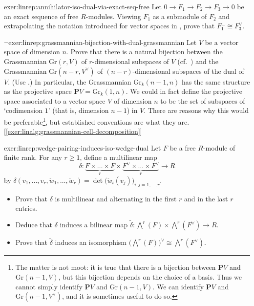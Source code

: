 \begin{exer}{}{exer:linrep:annihilator-iso-dual-via-exact-seq-free}
  Let $0 \to F_1 \to F_2 \to F_3 \to 0$ be an exact sequence of free
  $R$-modules. Viewing $F_1$ as a submodule of $F_2$ and extrapolating
  the notation introduced for vector spaces in
  , prove that
  $F_1^\perp \cong F_3^\vee$.
\end{exer}

\begin{exer}{$\lnot$}{exer:linrep:grassmannian-bijection-with-dual-grassmannian}
  Let $V$ be a vector space of dimension $n$. Prove that there is a
  natural bijection between the Grassmannian $\mathrm{Gr}(r, V)$ of
  $r$-dimensional subspaces of $V$ (cf.\
  ) and the
  Grassmannian $\mathrm{Gr}(n-r, V^\vee)$ of $(n-r)$-dimensional
  subspaces of the dual of $V$. (Use
  .) In particular,
  the Grassmannian $\mathrm{Gr}_k(n-1, n)$ has the same structure as
  the projective space $\mathbf{P}V = \mathrm{Gr}_k(1, n)$. We could
  in fact define the projective space associated to a vector space $V$
  of dimension $n$ to be the set of subspaces of `codimension $1$'
  (that is, dimension $n-1$) in $V$. There are reasons why this would
  be preferable\footnote{The matter is not moot: it is true that there
    is a bijection between $\mathbf{P}V$ and $\mathrm{Gr}(n-1,V)$, but
    this bijection depends on the choice of a basis. Thus we cannot
    simply identify $\mathbf{P}V$ and $\mathrm{Gr}(n-1,V)$. We can
    identify $\mathbf{P}V$ and $\mathrm{Gr}(n-1,V^\vee)$, and it is
    sometimes useful to do so.}, but established conventions are what
  they are. [\ref{exer:linalg:grassmannian-cell-decomposition}]
\end{exer}

\begin{exer}{}{exer:linrep:wedge-pairing-induces-iso-wedge-dual}
  Let $F$ be a free $R$-module of finite rank. For any $r \geq 1$,
  define a multilinear map
  \[
    \delta : \underbrace{F \times \dots \times F}_{r} \times
    \underbrace{F^\vee \times \dots \times F^\vee}_{r} \to R
  \]
  by
  $\delta(v_1, \dots, v_r, \check{w}_1, \dots, \check{w}_r) =
  \det\bigl(\check{w}_i(v_j)\bigr)_{i,j=1,\dots,r}$.
  \begin{itemize}
  \item Prove that $\delta$ is multilinear and alternating in the
    first $r$ and in the last $r$ entries.
  \item Deduce that $\delta$ induces a bilinear map
    $\tilde{\delta} : \bigwedge^r(F) \times \bigwedge^r(F^\vee) \to
    R$.
  \item Prove that $\tilde{\delta}$ induces an isomorphism
    $\bigl(\bigwedge^r(F)\bigr)^\vee \cong \bigwedge^r(F^\vee)$.
  \end{itemize}
\end{exer}

